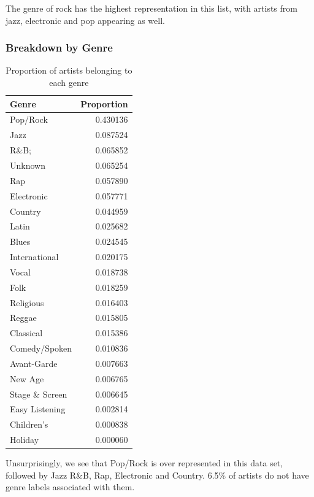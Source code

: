 The genre of rock has the highest representation in this list, with artists from jazz, electronic and pop appearing as well.


\subsubsection*{Breakdown by Genre}
\begin{table}[H]
\centering
\caption{Proportion of artists belonging to each genre}
\label{my-label}
\begin{tabular}{lr}
\hline
Genre &  Proportion \\
\hline
Pop/Rock       &    0.430136 \\
Jazz           &    0.087524 \\
R\&B;           &    0.065852 \\
Unknown        &    0.065254 \\
Rap            &    0.057890 \\
Electronic     &    0.057771 \\
Country        &    0.044959 \\
Latin          &    0.025682 \\
Blues          &    0.024545 \\
International  &    0.020175 \\
Vocal          &    0.018738 \\
Folk           &    0.018259 \\
Religious      &    0.016403 \\
Reggae         &    0.015805 \\
Classical      &    0.015386 \\
Comedy/Spoken  &    0.010836 \\
Avant-Garde    &    0.007663 \\
New Age        &    0.006765 \\
Stage \& Screen &    0.006645 \\
Easy Listening &    0.002814 \\
Children's     &    0.000838 \\
Holiday        &    0.000060 \\
\hline
\end{tabular}
\end{table}

Unsurprisingly, we see that Pop/Rock is over represented in this data set, followed by Jazz R\&B, Rap, Electronic and Country. 6.5\% of artists do not have genre labels associated with them.

